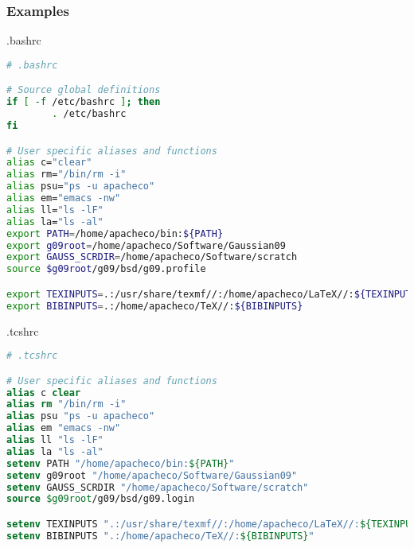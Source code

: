 \documentclass[10pt,t]{beamer}
\begin{document}
\begin{frame}
  \frametitle{Examples}
    \begin{block}{.bashrc}
      \begin{lstlisting}[language=bash]
# .bashrc

# Source global definitions
if [ -f /etc/bashrc ]; then
        . /etc/bashrc
fi

# User specific aliases and functions
alias c="clear"
alias rm="/bin/rm -i"
alias psu="ps -u apacheco"
alias em="emacs -nw"
alias ll="ls -lF"
alias la="ls -al"
export PATH=/home/apacheco/bin:${PATH}
export g09root=/home/apacheco/Software/Gaussian09
export GAUSS_SCRDIR=/home/apacheco/Software/scratch
source $g09root/g09/bsd/g09.profile

export TEXINPUTS=.:/usr/share/texmf//:/home/apacheco/LaTeX//:${TEXINPUTS}
export BIBINPUTS=.:/home/apacheco/TeX//:${BIBINPUTS}
      \end{lstlisting}
    \end{block}
    \begin{block}{.tcshrc}
      \begin{lstlisting}[language=csh]
# .tcshrc

# User specific aliases and functions
alias c clear
alias rm "/bin/rm -i"
alias psu "ps -u apacheco"
alias em "emacs -nw"
alias ll "ls -lF"
alias la "ls -al"
setenv PATH "/home/apacheco/bin:${PATH}"
setenv g09root "/home/apacheco/Software/Gaussian09"
setenv GAUSS_SCRDIR "/home/apacheco/Software/scratch"
source $g09root/g09/bsd/g09.login

setenv TEXINPUTS ".:/usr/share/texmf//:/home/apacheco/LaTeX//:${TEXINPUTS}"
setenv BIBINPUTS ".:/home/apacheco/TeX//:${BIBINPUTS}"
      \end{lstlisting}
    \end{block}
\end{frame}
\end{document}
